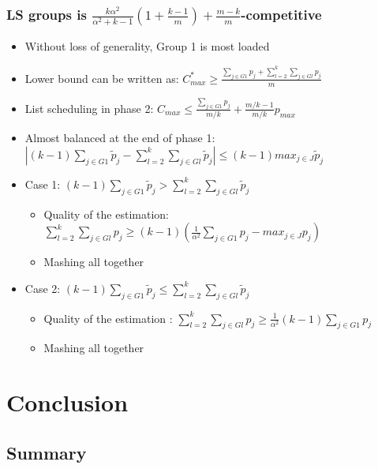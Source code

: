 \documentclass[usenames,dvipsnames]{beamer}
\begin{document}
\begin{frame}
  \frametitle{LS groups is $ \frac{k\alpha^{2}}{\alpha^{2}+k-1} (1+
    \frac{k-1}{m} ) + \frac{m-k}{m}$-competitive }
  
  
  \begin{itemize}
  \item Without loss of generality, Group 1 is most loaded
  \item Lower bound can be written as:
    $C_{max}^{*} \geq  \frac{\sum_{j \in G1 }^{}{{p_{j}}}+ \sum_{l=2}^{k}\sum_{j \in Gl }^{}{{p_{j}}}}{m}$
  \item List scheduling in phase 2: $C_{max} \leq \frac{\sum_{j \in G1 }^{}{{p_{j}}}}{m/k} + {\frac{m/k-1}{m/k}} p_{max}$
  \item Almost balanced at the end of phase 1: $\left | (k-1)\sum_{j \in G1 }^{}{\tilde p_{j}}- \sum_{l=2}^{k}\sum_{j \in Gl }^{}{\tilde p_{j}} \right | \leq (k-1) {max_{j \in J}}{\tilde p_{j}}$
  \pause
  \item Case 1: $(k-1)\sum_{j \in G1 }^{}{\tilde p_{j}} >
  \sum_{l=2}^{k}\sum_{j \in Gl }^{}{\tilde p_{j}}$
    \begin{itemize}
      \item Quality of the estimation: $\sum_{l=2}^{k}\sum_{j \in Gl }^{}{{p_{j}}} \geq (k-1) \left(\frac{1}{\alpha^{2}}\sum_{j \in G1 }^{}{{p_{j}}}-  {max_{j \in J}}{{p_{j}}} \right)$
      \item Mashing all together
    \end{itemize}
    \pause
  \item Case 2: $(k-1)\sum_{j \in G1 }^{}{\tilde p_{j}} \leq \sum_{l=2}^{k}\sum_{j \in Gl }^{}{\tilde p_{j}}$
    \begin{itemize}
    \item Quality of the estimation : $\sum_{l=2}^{k}\sum_{j \in Gl }^{}{ p_{j}} \geq \frac{1}{\alpha^2} (k-1)\sum_{j \in G1 }^{}{ p_{j}}$
    \item Mashing all together
    \end{itemize}

  \end{itemize}
\end{frame}



\section{Conclusion}

\subsection{Summary}
\end{document}
